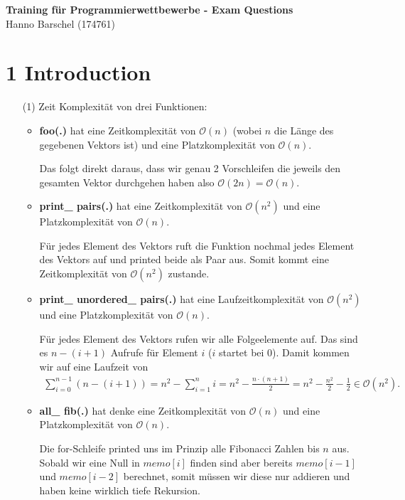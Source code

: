\documentclass[12pt]{scrartcl}
\begin{document}
\begin{center}
{\large \textbf{Training für Programmierwettbewerbe - Exam Questions}}\\
{\small Hanno Barschel (174761)}
\end{center}
\section{1 Introduction}
\begin{itemize}
\item[(1)] Zeit Komplexität von drei Funktionen:
\begin{itemize}
\item \textbf{foo(.)} hat eine Zeitkomplexität von $\mathcal{O}(n)$ (wobei $n$ die Länge des gegebenen Vektors ist) und eine Platzkomplexität von $\mathcal{O}(n)$.
\par
Das folgt direkt daraus, dass wir genau 2 Vorschleifen die jeweils den gesamten Vektor durchgehen haben also $\mathcal{O} (2n) = \mathcal{O}(n)$.
%
\item \textbf{print\_ pairs(.)} hat eine Zeitkomplexität von $\mathcal{O}(n^2)$ und eine Platzkomplexität von $\mathcal{O}(n)$.
\par
Für jedes Element des Vektors ruft die Funktion nochmal jedes Element des Vektors auf und printed beide als Paar aus. Somit kommt eine Zeitkomplexität von $\mathcal{O}(n^2)$ zustande.
%
\item \textbf{print\_ unordered\_ pairs(.)} hat eine Laufzeitkomplexität von $\mathcal{O}(n^2)$ und eine Platzkomplexität von $\mathcal{O}(n)$.
\par
Für jedes Element des Vektors rufen wir alle Folgeelemente auf. Das sind es $n-(i+1)$ Aufrufe für Element $i$ ($i$ startet bei $0$). Damit kommen wir auf eine Laufzeit von
\begin{align*}
\sum _{i=0} ^{n-1} (n-(i+1)) = n^2 - \sum _{i=1} ^n i = n^2 - \frac{n\cdot (n+1)}{2} = n^2 - \frac{n^2}{2} - \frac{1}{2} \in \mathcal{O}(n^2).
\end{align*}
%
\item \textbf{all\_ fib(.)} hat denke eine Zeitkomplexität von $\mathcal{O}(n)$ und eine Platzkomplexität von $\mathcal{O}(n)$.
\par
Die for-Schleife printed uns im Prinzip alle Fibonacci Zahlen bis $n$ aus. Sobald wir eine Null in $memo[i]$ finden sind aber bereits $memo[i-1]$ und $memo[i-2]$ berechnet, somit müssen wir diese nur addieren und haben keine wirklich tiefe Rekursion.
\end{itemize}
\end{itemize}
\end{document}
